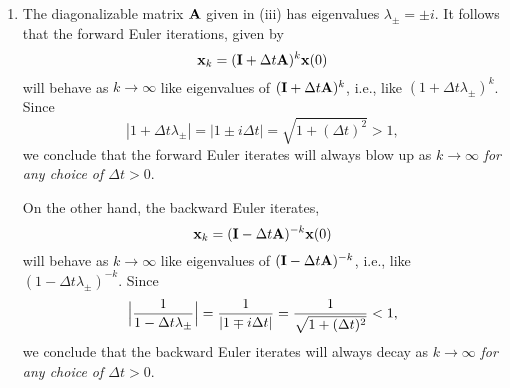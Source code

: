{\begin{solution}
\begin{enumerate}
\item The diagonalizable matrix ${\bf A}$ given in (iii) has eigenvalues $\lambda_\pm = \pm i$.
      It follows that the forward Euler iterations, given by
       \[ {\bf x}_k = ({\bf I} + \Delta t{\bf A})^k {\bf x}(0)\]
      will behave as $k\to\infty$ like eigenvalues of $({\bf I}+\Delta t{\bf A})^k$, i.e.,
      like $(1 + \Delta t \lambda_\pm)^k$. 
      Since
      \[ |1 + \Delta t \lambda_\pm| = |1 \pm i \Delta t| = \sqrt{1+(\Delta t)^2} > 1,\]
      we conclude that the forward Euler iterates will always blow up as $k\to\infty$
      \emph{for any choice of $\Delta t > 0$}.

      On the other hand, the backward Euler iterates,
       \[ {\bf x}_k = ({\bf I} - \Delta t{\bf A})^{-k} {\bf x}(0)\]
      will behave as $k\to\infty$ like eigenvalues of $({\bf I}-\Delta t{\bf A})^{-k}$, i.e.,
      like $(1 - \Delta t \lambda_\pm)^{-k}$.  Since 
      \[ \Big|{1\over 1 - \Delta t \lambda_\pm}\Big| 
       = {1 \over |1 \mp i \Delta t|} = {1\over \sqrt{1+(\Delta t)^2}} < 1,\]
      we conclude that the backward Euler iterates will always decay as $k\to\infty$
      \emph{for any choice of $\Delta t > 0$}.
\end{enumerate}

\end{solution}}{}


